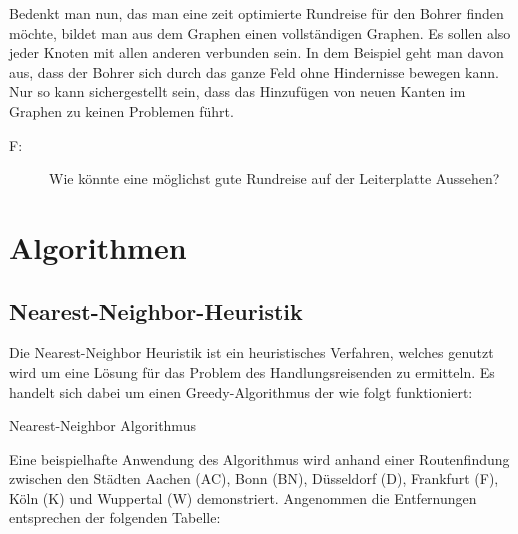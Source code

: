 \documentclass{article}
\begin{document}
Bedenkt man nun, das man eine zeit optimierte Rundreise für den Bohrer finden möchte, bildet man aus dem Graphen einen vollständigen Graphen. Es sollen also jeder Knoten mit allen anderen verbunden sein. In dem Beispiel geht man davon aus, dass der Bohrer sich durch das ganze Feld ohne Hindernisse bewegen kann. Nur so kann sichergestellt sein, dass das Hinzufügen von neuen Kanten im Graphen zu keinen Problemen führt.
\\
\begin{description}
	\item[F:] Wie könnte eine möglichst gute Rundreise auf der Leiterplatte Aussehen?
\end{description}


%
%
%
\section{Algorithmen}

\subsection{Nearest-Neighbor-Heuristik}

Die Nearest-Neighbor Heuristik ist ein heuristisches Verfahren, welches genutzt wird um eine Lösung für das Problem des Handlungsreisenden zu ermitteln. Es handelt sich dabei um einen Greedy-Algorithmus der wie folgt funktioniert:

\begin{algorithm}
\caption{Nearest-Neighbor Algorithmus}
\end{algorithm}

Eine beispielhafte Anwendung des Algorithmus wird anhand einer Routenfindung zwischen den Städten Aachen (AC), Bonn (BN), Düsseldorf (D), Frankfurt (F), Köln (K) und Wuppertal (W) demonstriert. Angenommen die Entfernungen entsprechen der folgenden Tabelle:
\end{document}
